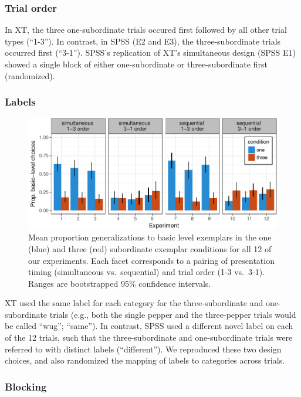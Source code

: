 \documentclass[english,floatsintext,man]{apa6}
\theoremstyle{definition}
\theoremstyle{definition}
\theoremstyle{definition}
\theoremstyle{remark}
\begin{document}
\subsubsection{Trial order}\label{trial-order}

In XT, the three one-subordinate trials occured first followed by all
other trial types (\enquote{1-3}). In contrast, in SPSS (E2 and E3), the
three-subordinate trials occurred first (\enquote{3-1}). SPSS's
replication of XT's simultaneous design (SPSS E1) showed a single block
of either one-subordinate or three-subordinate first (randomized).

\subsubsection{Labels}\label{labels}

\begin{figure}
\centering
\includegraphics{xtmem_files/figure-latex/unnamed-chunk-3-1.pdf}
\caption{\label{fig:unnamed-chunk-3}Mean proportion generalizations to basic
level exemplars in the one (blue) and three (red) subordinate exemplar
conditions for all 12 of our experiments. Each facet corresponds to a
pairing of presentation timing (simultaneous vs.~sequential) and trial
order (1-3 vs.~3-1). Ranges are bootstrapped 95\% confidence intervals.}
\end{figure}

XT used the same label for each category for the three-subordinate and
one-subordinate trials (e.g., both the single pepper and the
three-pepper trials would be called \enquote{wug}; \enquote{same}). In
contrast, SPSS used a different novel label on each of the 12 trials,
such that the three-subordinate and one-subordinate trials were referred
to with distinct labels (\enquote{different}). We reproduced these two
design choices, and also randomized the mapping of labels to categories
across trials.

\subsubsection{Blocking}\label{blocking}
\end{document}
